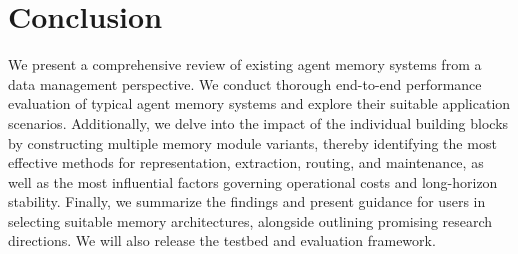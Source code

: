 \section{Conclusion}
\label{sec:conclusion}

We present a comprehensive review of existing agent memory systems from a data management perspective. We conduct thorough end-to-end performance evaluation of typical agent memory systems and explore their suitable application scenarios. Additionally, we delve into the impact of the individual building blocks by constructing multiple memory module variants, thereby identifying the most effective methods for representation, extraction, routing, and maintenance, as well as the most influential factors governing operational costs and long-horizon stability. Finally, we summarize the findings and present guidance for users in selecting suitable memory architectures, alongside outlining promising research directions. We will also release the testbed and evaluation framework.
